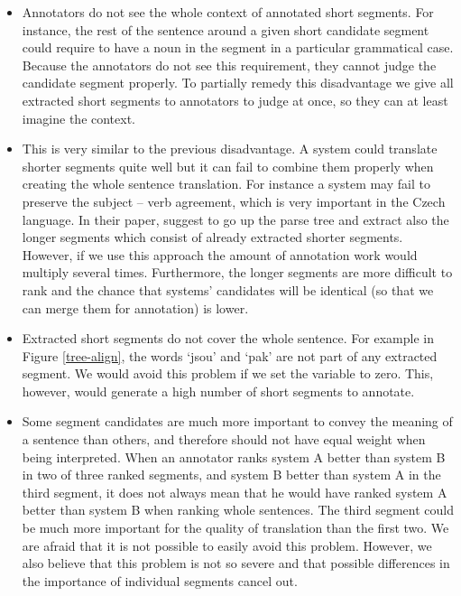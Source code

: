 \begin{itemize}

  \item Annotators do not see the whole context of annotated short segments.
    For instance, the rest of the sentence around a given short candidate segment
    could require to have a noun in the segment in a particular grammatical
    case. Because the annotators do not see this requirement, they cannot judge the
    candidate segment properly.  To partially remedy this disadvantage we
    give all extracted short segments to annotators to judge at once, so they
    can at least imagine the context.

  \item This is very similar to the previous disadvantage. A system could
    translate shorter segments quite well but it can fail to combine them
    properly when creating the whole sentence translation. For instance a
    system may fail to preserve the subject -- verb agreement, which is very
    important in the Czech language.  In their paper,
     suggest to go up the parse tree and extract
    also the longer segments which consist of already extracted shorter
    segments. However, if we use this approach the amount of annotation work
    would multiply several times. Furthermore, the longer segments are more
    difficult to rank and the chance that systems' candidates will be identical
    (so that we can merge them for annotation) is lower.

  \item Extracted short segments do not cover the whole sentence. For example
    in Figure \ref{tree-align}, the words `jsou' and `pak' are not part of any
    extracted segment. We would avoid this problem if we set the variable
     to zero. This, however, would generate a high number of short
    segments to annotate. 

  \item Some segment candidates are much more important to convey the meaning
    of a sentence than others, and therefore should not have equal weight when
    being interpreted. When an annotator ranks system A better than system B in
    two of three ranked segments, and system B better than system A in the
    third segment, it does not always mean that he would have ranked system A
    better than system B when ranking whole sentences. The third segment could
    be much more important for the quality of translation than the first two.
    We are afraid that it is not possible to easily avoid this problem.
    However, we also believe that this problem is not so severe and that
    possible differences in the importance of individual segments cancel out.

\end{itemize}

